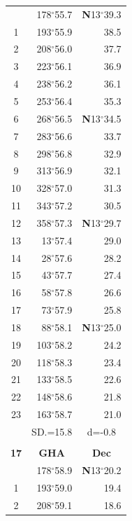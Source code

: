 \documentclass[10pt, a4paper]{report}
\begin{document}
\begin{scriptsize}
\begin{tabular*}{0.2\textwidth}[t]{@{\extracolsep{\fill}}|c|rr|}
\hline\rule{0pt}{2.6ex}\noindent
0 & 178$^\circ$55.7 & \textbf{N}13$^\circ$39.3\\
1 & 193$^\circ$55.9 & 38.5\\
2 & 208$^\circ$56.0 & 37.7\\
3 & 223$^\circ$56.1 & \raisebox{0.24ex}{\boldmath$\cdot$~\boldmath$\cdot$~~}36.9\\
4 & 238$^\circ$56.2 & 36.1\\
5 & 253$^\circ$56.4 & 35.3\\[2Pt]
6 & 268$^\circ$56.5 & \textbf{N}13$^\circ$34.5\\
7 & 283$^\circ$56.6 & 33.7\\
8 & 298$^\circ$56.8 & 32.9\\
9 & 313$^\circ$56.9 & \raisebox{0.24ex}{\boldmath$\cdot$~\boldmath$\cdot$~~}32.1\\
10 & 328$^\circ$57.0 & 31.3\\
11 & 343$^\circ$57.2 & 30.5\\[2Pt]
12 & 358$^\circ$57.3 & \textbf{N}13$^\circ$29.7\\
13 & 13$^\circ$57.4 & 29.0\\
14 & 28$^\circ$57.6 & 28.2\\
15 & 43$^\circ$57.7 & \raisebox{0.24ex}{\boldmath$\cdot$~\boldmath$\cdot$~~}27.4\\
16 & 58$^\circ$57.8 & 26.6\\
17 & 73$^\circ$57.9 & 25.8\\[2Pt]
18 & 88$^\circ$58.1 & \textbf{N}13$^\circ$25.0\\
19 & 103$^\circ$58.2 & 24.2\\
20 & 118$^\circ$58.3 & 23.4\\
21 & 133$^\circ$58.5 & \raisebox{0.24ex}{\boldmath$\cdot$~\boldmath$\cdot$~~}22.6\\
22 & 148$^\circ$58.6 & 21.8\\
23 & 163$^\circ$58.7 & 21.0\\
\hline
\rule{0pt}{2.4ex} & \multicolumn{1}{c}{SD.=15.8} & \multicolumn{1}{c|}{d=-0.8}\\
\hline
\multicolumn{1}{c}{}\\[-0.5ex]\hline
\multicolumn{1}{|c|}{\rule{0pt}{2.6ex}\textbf{17}} & \multicolumn{1}{c}{\textbf{GHA}} & \multicolumn{1}{c|}{\textbf{Dec}}\\
\hline\rule{0pt}{2.6ex}\noindent
0 & 178$^\circ$58.9 & \textbf{N}13$^\circ$20.2\\
1 & 193$^\circ$59.0 & 19.4\\
2 & 208$^\circ$59.1 & 18.6\\

\end{tabular*}
\end{scriptsize}
\end{document}
